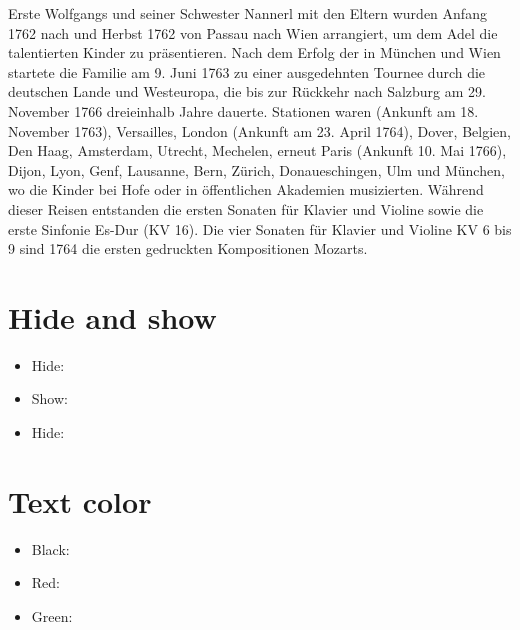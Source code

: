\documentclass{article}
\begin{document}
Erste  Wolfgangs und seiner Schwester Nannerl mit den
Eltern wurden Anfang 1762 nach  und Herbst 1762 von Passau nach
Wien arrangiert, um dem Adel die talentierten Kinder zu präsentieren.
Nach dem Erfolg der  in München und Wien startete
die Familie am 9. Juni 1763 zu einer ausgedehnten Tournee durch die
deutschen Lande und Westeuropa, die bis zur Rückkehr nach Salzburg am
29. November 1766 dreieinhalb Jahre dauerte. Stationen waren  (Ankunft am 18. November
1763), Versailles, London (Ankunft am 23. April 1764), Dover, Belgien,
Den Haag, Amsterdam, Utrecht, Mechelen, erneut Paris (Ankunft 10. Mai
1766), Dijon, Lyon, Genf, Lausanne, Bern, Zürich, Donaueschingen, Ulm
und München, wo die Kinder bei Hofe oder in öffentlichen Akademien
musizierten. Während dieser Reisen entstanden die ersten Sonaten für
Klavier und Violine sowie die erste Sinfonie Es-Dur (KV 16). Die vier
Sonaten für Klavier und Violine KV 6 bis 9 sind 1764 die ersten
gedruckten Kompositionen Mozarts.

\section{Hide and show}

\begin{itemize}
\item Hide: 
\item Show: 
\item Hide: 
\end{itemize}

\section{Text color}

\begin{itemize}
\item Black: 
\item Red: 
\item Green: 
\end{itemize}
\end{document}
